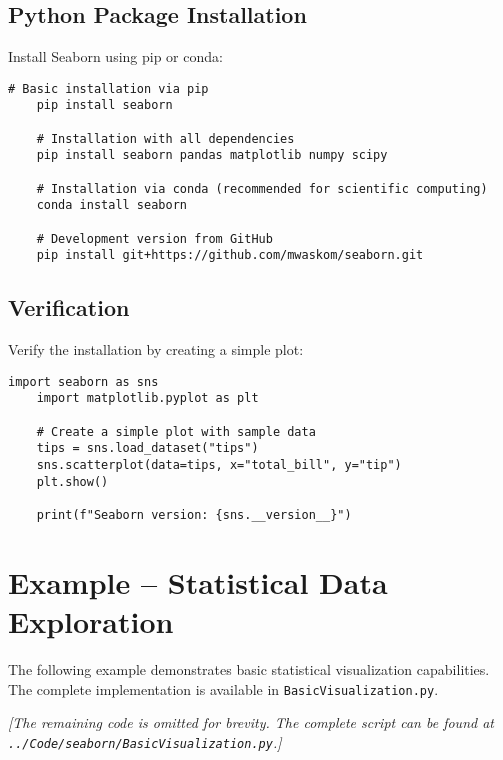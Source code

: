 \subsection{Python Package Installation}
\label{subsec:python_install}

Install Seaborn using pip or conda:

\begin{lstlisting}[style=bashstyle, caption={Seaborn Installation}]
	# Basic installation via pip
	pip install seaborn
	
	# Installation with all dependencies
	pip install seaborn pandas matplotlib numpy scipy
	
	# Installation via conda (recommended for scientific computing)
	conda install seaborn
	
	# Development version from GitHub
	pip install git+https://github.com/mwaskom/seaborn.git
\end{lstlisting}

\subsection{Verification}
\label{subsec:verification}

Verify the installation by creating a simple plot:

\begin{lstlisting}[language=MyPython, caption={Seaborn Installation Verification}]
	import seaborn as sns
	import matplotlib.pyplot as plt
	
	# Create a simple plot with sample data
	tips = sns.load_dataset("tips")
	sns.scatterplot(data=tips, x="total_bill", y="tip")
	plt.show()
	
	print(f"Seaborn version: {sns.__version__}")
\end{lstlisting}

\section{Example -- Statistical Data Exploration}
\label{sec:basic_example}

The following example demonstrates basic statistical visualization capabilities. The complete implementation is available in \texttt{BasicVisualization.py}.



\noindent\textit{[The remaining code is omitted for brevity. The complete script can be found at \texttt{../Code/seaborn/BasicVisualization.py}.]}

